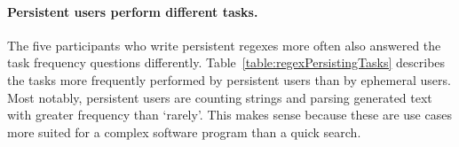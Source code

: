 \paragraph{Persistent users perform different tasks.} The five participants who write persistent regexes more often also answered the task frequency questions differently.  Table~\ref{table:regexPersistingTasks} describes the tasks more frequently performed by persistent users than by ephemeral users.  Most notably, persistent users are counting strings and parsing generated text with greater frequency than `rarely'.  This makes sense because these are use cases more suited for a complex software program than a quick search.


